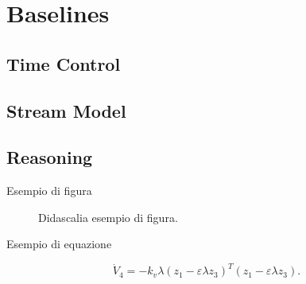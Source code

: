 \section{Baselines}
\subsection{Time Control}
\subsection{Stream Model}
\subsection{Reasoning}


Esempio di figura

\begin{figure}[ht]
\centerline{}
\caption{Didascalia esempio di figura.}
\label{fig:esempio}
\end{figure}

Esempio di equazione

\begin{equation}
\dot V_4= - k_v \lambda (z_1- \varepsilon \lambda z_3)^T(z_1-
\varepsilon \lambda z_3).
\end{equation}
